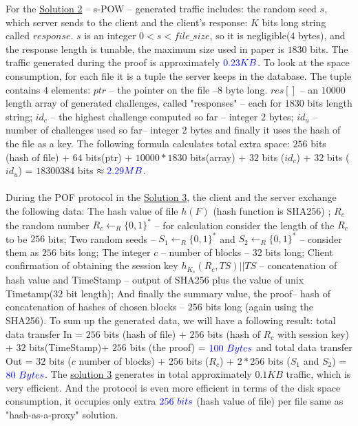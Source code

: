 \documentclass[12pt]{article}
\begin{document}
 For the \hyperref[sub:Soltuion2]{Solution 2} -- s-POW -- generated traffic includes: the random seed $s$, which server sends to the client and the client's response: $K$ bits long string called $response$. $s$ is an integer $0<s<file\_size$, so it is negligible($4$ bytes), and the response length is tunable, the maximum size used in paper is $1830$ bits. The traffic generated during the proof is  approximately $\color{blue}0.23 KB$. To look at the space consumption, for each file it is a tuple the server keeps in the database. The tuple contains  $4$ elements: $ptr$ -- the pointer on the file --$8$ byte long. $res []$ -- an $10000$ length array of generated challenges, called "responses" -- each for $1830$ bits length string; $id_c$ -- the highest challenge computed so far -- integer $2$ bytes; $id_u$ -- number of challenges used so far-- integer $2$ bytes and finally it uses the hash of the file as a key. The following formula calculates total extra space: $256$ bits (hash of file) + $64$ bits(ptr) + $10 000 * 1830$ bits(array) + $32$ bits ($id_c$) + $32$ bits ($id_u$) = $18300384$ bits $\approx\color{blue}2.29MB$. \\\\  
 During the POF protocol in the \hyperref[sub:Soltuion3]{Solution 3}, the client and the server  exchange the following data: The hash value of file $h(F)$ (hash function is SHA256) ; $R_c$ the random number $R_c \leftarrow _R \{0,1\}^*$ -- for calculation consider the length of the $R_c$ to be $256$ bits; Two random seeds -- $S_1 \leftarrow _R \{0,1\}^*$ and 
 $S_2 \leftarrow _R \{0,1\}^*$ -- consider them as $256$ bits long;  The integer $c$ -- number of blocks -- 32 bits long; Client confirmation of obtaining the session key $h_{K_s}(R_c,TS)||TS$ -- concatenation of hash value and TimeStamp -- output of SHA256 plus the value of unix Timetamp($32$ bit length); And finally the summary value, the proof-- hash of concatenation of hashes of chosen blocks -- $256$ bits long (again using the SHA256). To sum up the generated data, we will have a following result: total data transfer In =  $256$ bits (hash of file) +
 $256$ bits (hash of $R_c$ with session key) + $32$ bits(TimeStamp)+ $256$ bits (the proof) = $\color{blue} 100\ Bytes$ and total data transfer Out = $32$ bits ($c$ number of blocks) + $256$ bits ($R_c$) + $2*256$ bits ($S_1$ and $S_2$) = $\color{blue} 80\ Bytes$. The \hyperref[sub:Soltuion3]{solution 3} generates in total approximately $0.1 KB$ traffic, which is very efficient. And the protocol is even more efficient in terms of the disk space consumption, it occupies only extra $\color{blue}256\ bits$ (hash value of file) per file same as "hash-as-a-proxy" solution.\\\\
\end{document}
